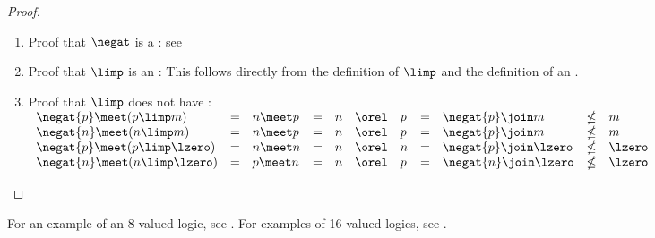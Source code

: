 \begin{proof}
\begin{enumerate}
  \item Proof that $\negat$ is a : see 
  \item Proof that $\limp$ is an : 
        This follows directly from the definition of $\limp$ and the definition of an  .
  \item Proof that $\limp$ does not have : 
    \\$\begin{array}{lclclclclcl}
      \negat{p}\meet(p\limp m) &=& n\meet p &=& n &\orel& p &=& \negat{p}\join m &\nleq& m\\
      \negat{n}\meet(n\limp m) &=& n\meet p &=& n &\orel& p &=& \negat{p}\join m &\nleq& m\\
      \negat{p}\meet(p\limp\lzero) &=& n\meet n &=& n &\orel& n &=& \negat{p}\join \lzero &\nleq& \lzero\\
      \negat{n}\meet(n\limp\lzero) &=& p\meet n &=& n &\orel& p &=& \negat{n}\join \lzero &\nleq& \lzero
    \end{array}$
\end{enumerate}
\end{proof}


For an example of an 8-valued logic, see .
For examples of 16-valued logics, see .




